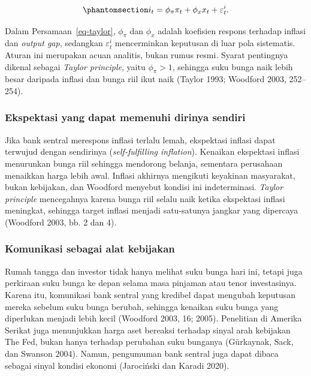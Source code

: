 \documentclass[
  manuscript=article,
  layout=brief,
  year=2026,
  volume=1,
]{den}
\begin{document}
\begin{equation}\protect\phantomsection\label{eq-taylor}{
i_t = \phi_\pi \pi_t + \phi_x x_t + \varepsilon_t^i.
}\end{equation}

Dalam Persamaan~\ref{eq-taylor}, \(\phi_\pi\) dan \(\phi_x\) adalah
koefisien respons terhadap inflasi dan \emph{output gap}, sedangkan
\(\varepsilon_t^i\) mencerminkan keputusan di luar pola sistematis.
Aturan ini merupakan acuan analitis, bukan rumus resmi. Syarat
pentingnya dikenal sebagai \emph{Taylor principle}, yaitu
\(\phi_\pi > 1\), sehingga suku bunga naik lebih besar daripada inflasi
dan bunga riil ikut naik (Taylor 1993; Woodford 2003, 252--254).

\subsubsection{Ekspektasi yang dapat memenuhi dirinya
sendiri}\label{ekspektasi-yang-dapat-memenuhi-dirinya-sendiri}

Jika bank sentral merespons inflasi terlalu lemah, ekspektasi inflasi
dapat terwujud dengan sendirinya (\emph{self-fulfilling inflation}).
Kenaikan ekspektasi inflasi menurunkan bunga riil sehingga mendorong
belanja, sementara perusahaan menaikkan harga lebih awal. Inflasi
akhirnya mengikuti keyakinan masyarakat, bukan kebijakan, dan Woodford
menyebut kondisi ini indeterminasi. \emph{Taylor principle} mencegahnya
karena bunga riil selalu naik ketika ekspektasi inflasi meningkat,
sehingga target inflasi menjadi satu-satunya jangkar yang dipercaya
(Woodford 2003, bb. 2 dan 4).

\subsubsection{Komunikasi sebagai alat
kebijakan}\label{komunikasi-sebagai-alat-kebijakan}

Rumah tangga dan investor tidak hanya melihat suku bunga hari ini,
tetapi juga perkiraan suku bunga ke depan selama masa pinjaman atau
tenor investasinya. Karena itu, komunikasi bank sentral yang kredibel
dapat mengubah keputusan mereka sebelum suku bunga berubah, sehingga
kenaikan suku bunga yang diperlukan menjadi lebih kecil (Woodford 2003,
16; 2005). Penelitian di Amerika Serikat juga menunjukkan harga aset
bereaksi terhadap sinyal arah kebijakan The Fed, bukan hanya terhadap
perubahan suku bunganya (Gürkaynak, Sack, dan Swanson 2004). Namun,
pengumuman bank sentral juga dapat dibaca sebagai sinyal kondisi ekonomi
(Jarociński dan Karadi 2020).
\end{document}
